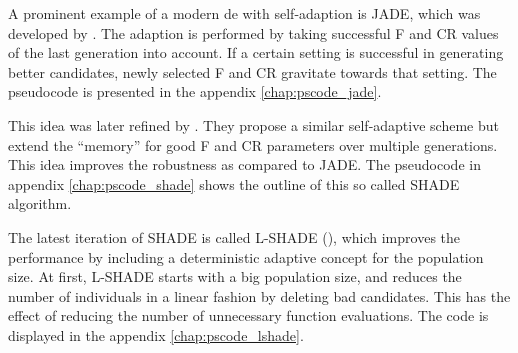 \documentclass[./\jobname.tex]{subfiles}
\begin{document}
A prominent example of a modern \gls{de} with self-adaption is JADE, which was developed by \cite{zhang_jade_2009}. The adaption is performed by taking successful F and CR values of the last generation into account. If a certain setting is successful in generating better candidates, newly selected F and CR gravitate towards that setting. The pseudocode is presented in the appendix \ref{chap:pscode_jade}. 

This idea was later refined by \cite{tanabe_success-history_2013}. They propose a similar self-adaptive scheme but extend the ``memory'' for good F and CR parameters over multiple generations. This idea improves the robustness as compared to JADE. The pseudocode in appendix \ref{chap:pscode_shade} shows the outline of this so called SHADE algorithm. 

The latest iteration of SHADE is called L-SHADE (\cite{tanabe_improving_2014}), which improves the performance by including a deterministic adaptive concept for the population size. At first, L-SHADE starts with a big population size, and reduces the number of individuals in a linear fashion by deleting bad candidates. This has the effect of reducing the number of unnecessary function evaluations. The code is displayed in the appendix \ref{chap:pscode_lshade}. 
\end{document}
